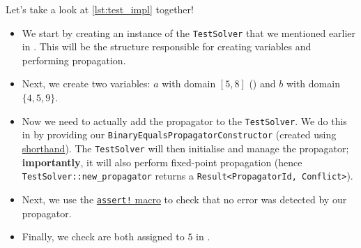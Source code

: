 \documentclass{article}
\begin{document}
        Let's take a look at \autoref{lst:test_impl} together!
        \begin{itemize}
            \item 
                We start by creating an instance of the \texttt{TestSolver} that we mentioned earlier in .
                This will be the structure responsible for creating variables and performing propagation.
            \item 
                Next, we create two variables: $a$ with domain $[5, 8]$ () and $b$ with domain $\{4, 5, 9\}$.
            \item 
                Now we need to actually add the propagator to the \texttt{TestSolver}.
                We do this in  by providing our \texttt{BinaryEqualsPropagatorConstructor} (created using \href{https://doc.rust-lang.org/book/ch05-01-defining-structs.html#using-the-field-init-shorthand}{shorthand}).
                The \texttt{TestSolver} will then initialise and manage the propagator; \textbf{importantly}, it will also perform fixed-point propagation (hence \texttt{TestSolver::new_propagator} returns a \texttt{Result<PropagatorId, Conflict>}).
            \item
                Next, we use the \href{https://doc.rust-lang.org/book/ch11-01-writing-tests.html#checking-results-with-assert}{\texttt{assert!} macro} to check that no error was detected by our propagator.
            \item 
                Finally, we check are both assigned to $5$ in .
        \end{itemize}
        
\end{document}
